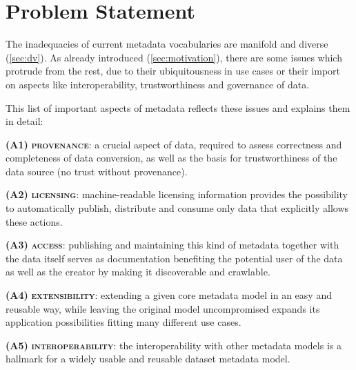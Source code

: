\documentclass[a4paper,english,twoside,BCOR1.5cm,headsepline,DIV12,appendixprefix,final,12pt]{scrbook}
\newcommand{\provenance}{{\ttfamily\scshape\bfseries provenance}\xspace}
\newcommand{\licensing}{{\ttfamily\scshape\bfseries licensing}\xspace}
\newcommand{\access}{{\ttfamily\scshape\bfseries access}\xspace}
\newcommand{\extensibility}{{\ttfamily\scshape\bfseries extensibility}\xspace}
\newcommand{\interoperability}{{\ttfamily\scshape\bfseries interoperability}\xspace}
\newcommand{\odrl}{{\scshape\bfseries odrl}\xspace}
\begin{document}
\section{Problem Statement} 
\label{sec:probstat}

The inadequacies of current metadata vocabularies are manifold and diverse (\cref{sec:dv}). As already introduced (\cref{sec:motivation}), there are some issues which protrude from the rest, due to their ubiquitousness in use cases or their import on aspects like interoperability, trustworthiness and governance of data.

This list of important aspects of metadata reflects these issues and explains them in detail:

\textbf{(A1)} \provenance: a crucial aspect of data, required to assess correctness and completeness of data conversion, as well as the basis for trustworthiness of the data source (no trust without provenance). 

\textbf{(A2)} \licensing: machine-readable licensing information provides the possibility to automatically
publish, distribute and consume only data that explicitly allows these actions. %

\textbf{(A3)} \access: publishing and maintaining
this kind of metadata together with the data itself serves as
documentation benefiting the potential user
of the data as well as the creator by making it discoverable
and crawlable. 

\textbf{(A4)} \extensibility: extending a given core metadata model
in an easy and reusable way, while leaving the original model uncompromised expands its application possibilities fitting many
different use cases. 

\textbf{(A5)} \interoperability: the interoperability with other metadata models is a hallmark for a widely usable and reusable dataset metadata model.
\end{document}
